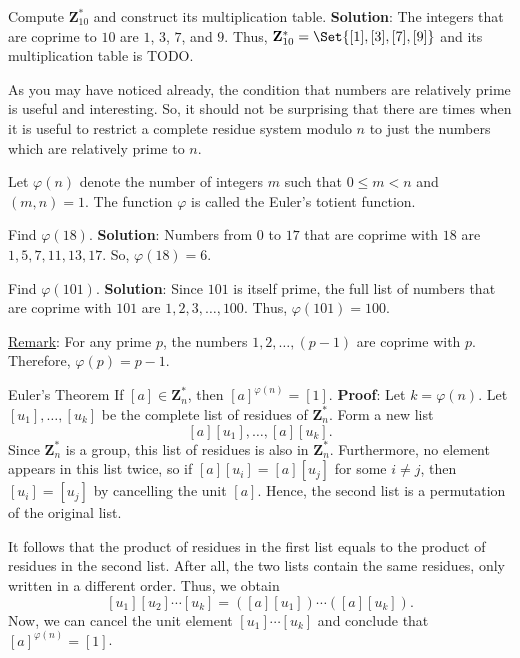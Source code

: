 \begin{Example}{}{}
    Compute $ \mathbf{Z}_{10}^* $ and construct its multiplication table.
    \tcblower{}
    \textbf{Solution}: The integers that are coprime to $10$ are $ 1 $, $ 3 $, $ 7 $, and $ 9 $. Thus,
    $ \mathbf{Z}_{10}^*=\Set{[1],[3],[7],[9]} $ and its multiplication table is TODO\@.
\end{Example}
As you may have noticed already, the condition that numbers are relatively
prime is useful and interesting. So, it should not be surprising that there are times
when it is useful to restrict a complete residue system modulo $n$ to just the numbers
which are relatively prime to $n$.
\begin{Definition}{}{}
    Let $ \varphi(n) $ denote the number of integers $ m $ such that $ 0\le m<n $ and $ (m,n)=1 $. The function
    $ \varphi $ is called the Euler's totient function.
\end{Definition}
\begin{Example}{}{}
    Find $ \varphi(18) $.
    \tcblower{}
    \textbf{Solution}: Numbers from $0$ to $17$ that are coprime with $18$ are $ 1,5,7,11,13,17 $.
    So, $ \varphi(18)=6 $.
\end{Example}
\begin{Example}{}{}
    Find $ \varphi(101) $.
    \tcblower{}
    \textbf{Solution}: Since $101$ is itself prime, the full list of numbers that are
    coprime with $101$ are $ 1,2,3,\ldots,100 $. Thus, $ \varphi(101)=100 $.
\end{Example}
\underline{Remark}: For any prime $ p $, the numbers $ 1,2,\ldots,(p-1) $ are coprime
with $ p $. Therefore, $ \varphi(p)=p-1 $.
\begin{Theorem}{Euler's Theorem}{}
    If $ [a]\in\mathbf{Z}_n^* $, then $ [a]^{\varphi(n)}=[1] $.
    \tcblower{}
    \textbf{Proof}: Let $ k=\varphi(n) $. Let $ [u_1],\ldots,[u_k] $
    be the complete list of residues of $ \mathbf{Z}_n^* $. Form a new list
    \[ [a][u_1],\ldots,[a][u_k]. \]
    Since $ \mathbf{Z}_n^* $ is a group, this list of residues is also in $ \mathbf{Z}_n^* $. Furthermore,
    no element appears in this list twice, so if $ [a][u_i]=[a][u_j] $ for some $ i\ne j $, then $ [u_i]=[u_j] $
    by cancelling the unit $ [a] $. Hence, the second list is a permutation of the original list.

    It follows that the product of residues in the first list equals to the product of residues in the second list. After all, the two lists
    contain the same residues, only written in a different order. Thus, we obtain
    \[ [u_1][u_2]\cdots[u_k]=([a][u_1])\cdots([a][u_k]). \]
    Now, we can cancel the unit element $ [u_1]\cdots[u_k] $ and conclude that $ [a]^{\varphi(n)}=[1] $.
\end{Theorem}
